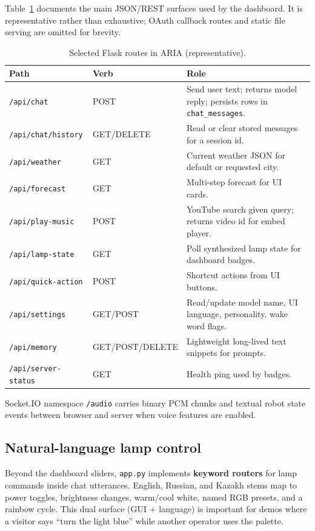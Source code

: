 \documentclass[12pt,a4paper]{report}
\begin{document}
Table~\ref{tab:api-routes} documents the main JSON/REST surfaces used by the dashboard. It is representative rather than exhaustive; OAuth callback routes and static file serving are omitted for brevity.

\begin{table}[htbp]
\centering
\caption{Selected Flask routes in ARIA (representative).}
\label{tab:api-routes}
\small
\begin{tabularx}{\textwidth}{@{}p{}p{}X@{}}
\toprule
\textbf{Path} & \textbf{Verb} & \textbf{Role} \\
\midrule
\texttt{/api/chat} & POST & Send user text; returns model reply; persists rows in \texttt{chat\_messages}. \\
\texttt{/api/chat/history} & GET/DELETE & Read or clear stored messages for a session id. \\
\texttt{/api/weather} & GET & Current weather JSON for default or requested city. \\
\texttt{/api/forecast} & GET & Multi-step forecast for UI cards. \\
\texttt{/api/play-music} & POST & YouTube search given query; returns video id for embed player. \\
\texttt{/api/lamp-state} & GET & Poll synthesized lamp state for dashboard badges. \\
\texttt{/api/quick-action} & POST & Shortcut actions from UI buttons. \\
\texttt{/api/settings} & GET/POST & Read/update model name, UI language, personality, wake word flags. \\
\texttt{/api/memory} & GET/POST/DELETE & Lightweight long-lived text snippets for prompts. \\
\texttt{/api/server-status} & GET & Health ping used by badges. \\
\bottomrule
\end{tabularx}
\end{table}

Socket.IO namespace \texttt{/audio} carries binary PCM chunks and textual robot state events between browser and server when voice features are enabled.

\subsection{Natural-language lamp control}

Beyond the dashboard sliders, \texttt{app.py} implements \textbf{keyword routers} for lamp commands inside chat utterances. English, Russian, and Kazakh stems map to power toggles, brightness changes, warm/cool white, named RGB presets, and a rainbow cycle. This dual surface (GUI + language) is important for demos where a visitor says ``turn the light blue'' while another operator uses the palette.
\end{document}
